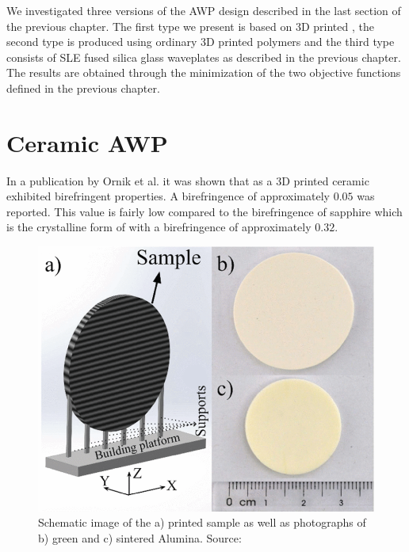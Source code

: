 We investigated three versions of the AWP design described in the last section of the previous chapter. The first type we present is based on 3D printed , the second type is produced using ordinary 3D printed polymers and the third type consists of SLE fused silica glass waveplates as described in the previous chapter. The results are obtained through the minimization of the two objective functions defined in the previous chapter.


\section{Ceramic AWP}
In a publication by Ornik et al. it was shown that  as a 3D printed ceramic exhibited birefringent properties. A birefringence of approximately $0.05$ was reported. This value is fairly low compared to the birefringence of sapphire which is the crystalline form of  with a birefringence of approximately $0.32$. 
\begin{figure}[h]
    \centering
    \includegraphics[scale=0.4]{images/5_chapter05/ornik1abc-3047514-large.png}
    \caption{Schematic image of the a) printed sample as well as photographs of b) green and c) sintered Alumina. Source: \cite{Ornik2021}}
    \label{fig:ornik1abc}
\end{figure}

